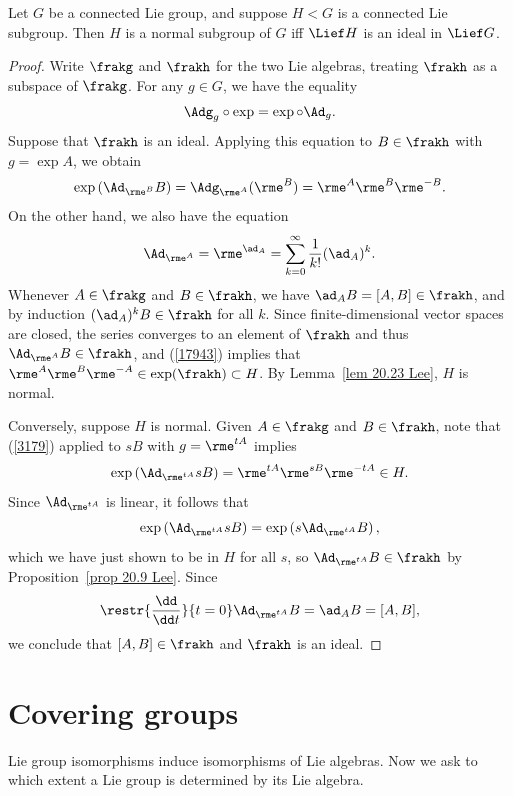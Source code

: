 \begin{thm}\label{thm 20.28 Lee}
    Let $G$ be a connected Lie group, and suppose $H<G$ is a connected Lie subgroup. Then $H$ is a normal subgroup of $G$ iff $\Lief H$ is an ideal in $\Lief G$.
\end{thm}
\begin{proof}
    Write $\frakg$ and $\frakh$ for the two Lie algebras, treating $\frakh$ as a subspace of $\frakg$. For any $g\in G$, we have the equality \[\Adg_g\circ \exp=\exp\circ \Ad_g.\label{3179}\]
    Suppose that $\frakh$ is an ideal. Applying this equation to $B\in\frakh$ with $g=\exp A$, we obtain
    \[\exp\left(\Ad_{\rme^B}B\right)=\Adg_{\rme^A}(\rme^B)=\rme^A \rme^B \rme^{-B}.\label{17943}\]
    On the other hand, we also have the equation
    \[\Ad_{\rme^A}=\rme^{\ad_A}=\sum_{k=0}^\infty \frac{1}{k!}(\ad_A)^k.\]
    Whenever $A\in\frakg$ and $B\in\frakh$, we have $\ad_A B=[A,B]\in\frakh$, and by induction $(\ad_A)^k B\in \frakh$ for all $k$. Since finite-dimensional vector spaces are closed, the series converges to an element of $\frakh$ and thus $\Ad_{\rme^A}B\in\frakh$, and (\ref{17943}) implies that $\rme^A \rme^B \rme^{-A}\in \exp (\frakh)\subset H $. By Lemma~\ref{lem 20.23 Lee}, $H$ is normal.

    Conversely, suppose $H$ is normal. Given $A\in\frakg$ and $B\in\frakh$, note that (\ref{3179}) applied to $sB$ with $g=\rme^{tA}$ implies
    \[\exp\left(\Ad_{\rme^{tA}} sB\right)=\rme^{tA}\rme^{sB}\rme^{-tA}\in H.\]
    Since $\Ad_{\rme^{tA}}$ is linear, it follows that
    \[\exp\left(\Ad_{\rme^{tA}}sB\right)=\exp\left(s\Ad_{\rme^{tA}}B\right),\]
    which we have just shown to be in $H$ for all $s$, so $\Ad_{\rme^{tA}}B\in\frakh$ by Proposition~\ref{prop 20.9 Lee}. Since
    \[\restr{\frac{\dd}{\dd t}}{t=0}\Ad_{\rme^{tA}}B=\ad_A B=[A,B],\]
    we conclude that $[A,B]\in\frakh$ and $\frakh$ is an ideal.
\end{proof}









\section{Covering groups}


Lie group isomorphisms induce isomorphisms of Lie algebras. Now we ask to which extent a Lie group is determined by its Lie algebra.

